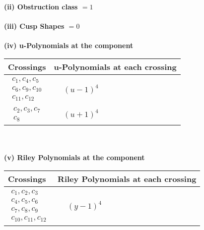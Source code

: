 \documentclass[1p]{elsarticle_modified}
\theoremstyle{definition}
\begin{document}
\flushleft \textbf{(ii) Obstruction class $= 1$}\\~\\
\flushleft \textbf{(iii) Cusp Shapes $= 0$}\\~\\
\newpage\renewcommand{\arraystretch}{1}
\flushleft \textbf{(iv) u-Polynomials at the component}\newline \\
\begin{tabular}{m{50pt}|m{274pt}}
Crossings & \hspace{64pt}u-Polynomials at each crossing \\
\hline $$\begin{aligned}c_{1},c_{4},c_{5}\\c_{6},c_{9},c_{10}\\c_{11},c_{12}\end{aligned}$$&$\begin{aligned}
&(u-1)^4
\end{aligned}$\\
\hline $$\begin{aligned}c_{2},c_{3},c_{7}\\c_{8}\end{aligned}$$&$\begin{aligned}
&(u+1)^4
\end{aligned}$\\
\hline
\end{tabular}\\~\\
\newpage\renewcommand{\arraystretch}{1}
\flushleft \textbf{(v) Riley Polynomials at the component}\newline \\
\begin{tabular}{m{50pt}|m{274pt}}
Crossings & \hspace{64pt}Riley Polynomials at each crossing \\
\hline $$\begin{aligned}c_{1},c_{2},c_{3}\\c_{4},c_{5},c_{6}\\c_{7},c_{8},c_{9}\\c_{10},c_{11},c_{12}\end{aligned}$$&$\begin{aligned}
&(y-1)^4
\end{aligned}$\\
\hline
\end{tabular}\\~\\
\end{document}
